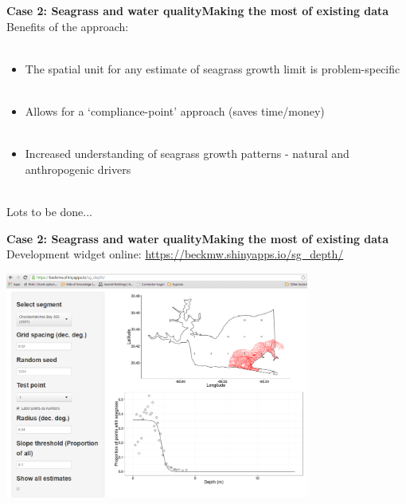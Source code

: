 \documentclass[serif]{beamer}\usepackage[]{graphicx}\usepackage[]{color}
\begin{document}
\begin{frame}{\textbf{Case 2: Seagrass and water quality}}{\textbf{Making the most of existing data}}
\onslide<+->
Benefits of the approach: \\~\\
\begin{itemize}
\item The spatial unit for any estimate of seagrass growth limit is problem-specific \\~\\
\item Allows for a `compliance-point' approach (saves time/money) \\~\\
\item Increased understanding of seagrass growth patterns - natural and anthropogenic drivers \\~\\
\end{itemize}
\onslide<+->
Lots to be done...
\end{frame}

\begin{frame}{\textbf{Case 2: Seagrass and water quality}}{\textbf{Making the most of existing data}}
Development widget online: \href{https://beckmw.shinyapps.io/sg_depth/}{https://beckmw.shinyapps.io/sg_depth/}
\centerline{\includegraphics[width = 0.75\textwidth]{fig/widget.png}}
\end{frame}
\end{document}
